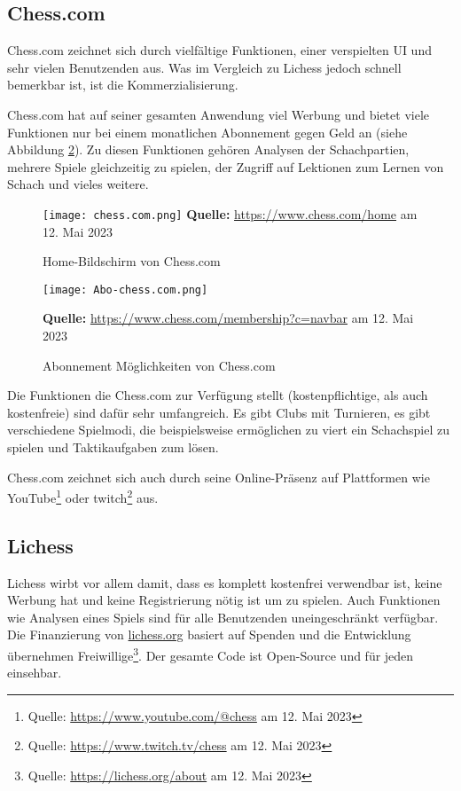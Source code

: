 \subsection{Chess.com}
Chess.com zeichnet sich durch vielfältige Funktionen, einer verspielten UI und sehr vielen Benutzenden aus. Was im Vergleich zu Lichess jedoch schnell bemerkbar ist, ist die Kommerzialisierung.

Chess.com hat auf seiner gesamten Anwendung viel Werbung und bietet viele Funktionen nur bei einem monatlichen Abonnement gegen Geld an (siehe Abbildung \ref{fig:chess.com-abo}). Zu diesen Funktionen gehören Analysen der Schachpartien, mehrere Spiele gleichzeitig zu spielen, der Zugriff auf Lektionen zum Lernen von Schach und vieles weitere.

  \begin{figure}[!htb]
  \centering
  \texttt{[image: chess.com.png]}
\raggedleft
    \footnotesize\sffamily\textbf{Quelle:} \url{https://www.chess.com/home} am 12. Mai 2023
  \caption{Home-Bildschirm von Chess.com}
  \label{fig:chess.com}
\end{figure}

  \begin{figure}[!htb]
  \centering
  \texttt{[image: Abo-chess.com.png]}
  
\raggedleft

    \footnotesize\sffamily\textbf{Quelle:} \url{https://www.chess.com/membership?c=navbar} am 12. Mai 2023
  \caption{Abonnement Möglichkeiten von Chess.com}
  \label{fig:chess.com-abo}
\end{figure}

Die Funktionen die Chess.com zur Verfügung stellt (kostenpflichtige, als auch kostenfreie) sind dafür sehr umfangreich. Es gibt Clubs mit Turnieren, es gibt verschiedene Spielmodi, die beispielsweise ermöglichen zu viert ein Schachspiel zu spielen und Taktikaufgaben zum lösen.

Chess.com zeichnet sich auch durch seine Online-Präsenz auf Plattformen wie YouTube\footnote{Quelle: \url{https://www.youtube.com/@chess} am 12. Mai 2023} oder twitch\footnote{Quelle: \url{https://www.twitch.tv/chess} am 12. Mai 2023} aus.


\subsection{Lichess}
Lichess wirbt vor allem damit, dass es komplett kostenfrei verwendbar ist, keine Werbung hat und keine Registrierung nötig ist um zu spielen. Auch Funktionen wie Analysen eines Spiels sind für alle Benutzenden uneingeschränkt verfügbar. Die Finanzierung von \url{lichess.org} basiert auf Spenden und die Entwicklung übernehmen Freiwillige\footnote{Quelle: \url{https://lichess.org/about} am 12. Mai 2023}. Der gesamte Code ist Open-Source und für jeden einsehbar.

